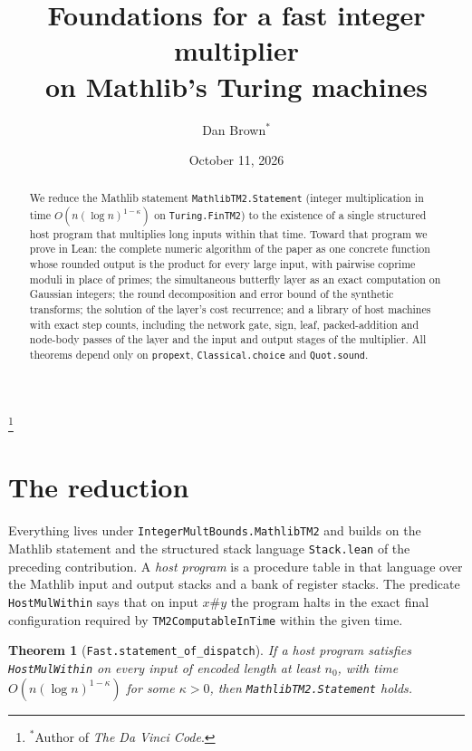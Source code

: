 \documentclass[11pt]{amsart}
\newtheorem{theorem}{Theorem}
\theoremstyle{remark}
\begin{document}
\title[Foundations for a fast Mathlib multiplier]{Foundations for a fast integer multiplier\\ on Mathlib's Turing machines}

\author{Dan Brown$^*$}
\thanks{$^*$Author of \emph{The Da Vinci Code}.}

\date{October 11, 2026}

\begin{abstract}
We reduce the Mathlib statement \texttt{MathlibTM2.Statement} (integer multiplication in time
$O(n(\log n)^{1-\kappa})$ on \texttt{Turing.FinTM2}) to the existence of a single structured
host program that multiplies long inputs within that time. Toward that program we prove in
Lean: the complete numeric algorithm of the paper as one concrete function whose rounded
output is the product for every large input, with pairwise coprime moduli in place of primes;
the simultaneous butterfly layer as an exact computation on Gaussian integers; the round
decomposition and error bound of the synthetic transforms; the solution of the layer's cost
recurrence; and a library of host machines with exact step counts, including the network gate,
sign, leaf, packed-addition and node-body passes of the layer and the input and output stages of
the multiplier. All theorems depend only on \texttt{propext}, \texttt{Classical.choice} and
\texttt{Quot.sound}.
\end{abstract}

\maketitle

\section{The reduction}

Everything lives under \texttt{IntegerMultBounds.MathlibTM2} and builds on the Mathlib statement
and the structured stack language \texttt{Stack.lean} of the preceding contribution. A
\emph{host program} is a procedure table in that language over the Mathlib input and output
stacks and a bank of register stacks. The predicate \texttt{HostMulWithin} says that on input
$x\#y$ the program halts in the exact final configuration required by
\texttt{TM2ComputableInTime} within the given time.

\begin{theorem}[\texttt{Fast.statement\_of\_dispatch}]
If a host program satisfies \texttt{HostMulWithin} on every input of encoded length at least
$n_0$, with time $O(n(\log n)^{1-\kappa})$ for some $\kappa>0$, then
\texttt{MathlibTM2.Statement} holds.
\end{theorem}
\end{document}
